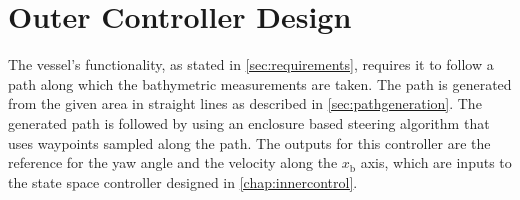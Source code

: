 \chapter{Outer Controller Design}\label{chap:outerController}

The vessel's functionality, as stated in \autoref{sec:requirements}, requires it to follow a path along which the bathymetric measurements are taken. The path is generated from the given area in straight lines as described in \autoref{sec:pathgeneration}.  The generated path is followed by using an enclosure based steering algorithm \cite[pp. 258-265]{TFossen} that uses waypoints sampled along the path. The outputs for this controller are the reference for the yaw angle and the velocity along the $x_\mathrm{b}$ axis, which are inputs to the state space controller designed in \autoref{chap:innercontrol}.

